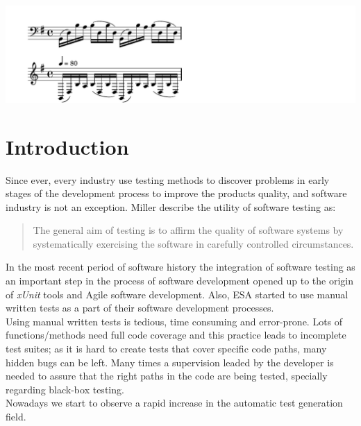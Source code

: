 \begin{savequote}[10pc]
{%
\parindent 0pt
\ifx\preLilyPondExample \undefined
\else
  \expandafter\preLilyPondExample
\fi
\def\lilypondbook{}%
\includegraphics[width=3.5\textwidth]{images/bachPrelude}
\ifx\postLilyPondExample \undefined
\else
  \expandafter\postLilyPondExample
\fi
}
\end{savequote}
\chapter{Introduction}
\minitoc

Since ever, every industry use testing methods to discover problems in early stages of the development process to improve
the products quality, and software industry is not an exception. Miller\cite{miller} describe the utility
of software testing as:

\begin{quotation}
The general aim of testing is to affirm the quality of software systems by systematically
exercising the software in carefully controlled circumstances.
\end{quotation}

In the most recent period of software history the integration of
software testing as an important step in the process of
software development opened up to the origin of \textit{xUnit}\cite{xunit}
tools and Agile software development.
Also, ESA started to use manual written tests as a part of their
software development processes.\\
Using  manual written tests is tedious, time consuming and error-prone.
Lots of functions/methods need full code coverage and this practice
leads to incomplete test suites;
as it is hard to create tests that cover specific code paths, many
hidden bugs can be left.
Many times a supervision leaded by the developer
is needed to assure that the right paths in the code are being tested,
specially regarding black-box testing.\\
Nowadays we start to observe a rapid increase in the automatic test
generation field.

